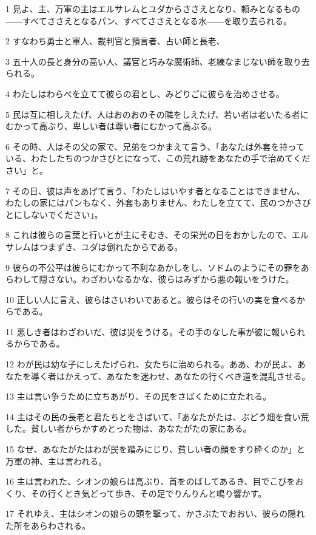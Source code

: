 \par 1 見よ、主、万軍の主はエルサレムとユダからささえとなり、頼みとなるもの――すべてささえとなるパン、すべてささえとなる水――を取り去られる。
\par 2 すなわち勇士と軍人、裁判官と預言者、占い師と長老、
\par 3 五十人の長と身分の高い人、議官と巧みな魔術師、老練なまじない師を取り去られる。
\par 4 わたしはわらべを立てて彼らの君とし、みどりごに彼らを治めさせる。
\par 5 民は互に相しえたげ、人はおのおのその隣をしえたげ、若い者は老いたる者にむかって高ぶり、卑しい者は尊い者にむかって高ぶる。
\par 6 その時、人はその父の家で、兄弟をつかまえて言う、「あなたは外套を持っている、わたしたちのつかさびとになって、この荒れ跡をあなたの手で治めてください」と。
\par 7 その日、彼は声をあげて言う、「わたしはいやす者となることはできません、わたしの家にはパンもなく、外套もありません、わたしを立てて、民のつかさびとにしないでください」。
\par 8 これは彼らの言葉と行いとが主にそむき、その栄光の目をおかしたので、エルサレムはつまずき、ユダは倒れたからである。
\par 9 彼らの不公平は彼らにむかって不利なあかしをし、ソドムのようにその罪をあらわして隠さない。わざわいなるかな、彼らはみずから悪の報いをうけた。
\par 10 正しい人に言え、彼らはさいわいであると。彼らはその行いの実を食べるからである。
\par 11 悪しき者はわざわいだ、彼は災をうける。その手のなした事が彼に報いられるからである。
\par 12 わが民は幼な子にしえたげられ、女たちに治められる。ああ、わが民よ、あなたを導く者はかえって、あなたを迷わせ、あなたの行くべき道を混乱させる。
\par 13 主は言い争うために立ちあがり、その民をさばくために立たれる。
\par 14 主はその民の長老と君たちとをさばいて、「あなたがたは、ぶどう畑を食い荒した。貧しい者からかすめとった物は、あなたがたの家にある。
\par 15 なぜ、あなたがたはわが民を踏みにじり、貧しい者の顔をすり砕くのか」と万軍の神、主は言われる。
\par 16 主は言われた、シオンの娘らは高ぶり、首をのばしてあるき、目でこびをおくり、その行くとき気どって歩き、その足でりんりんと鳴り響かす。
\par 17 それゆえ、主はシオンの娘らの頭を撃って、かさぶたでおおい、彼らの隠れた所をあらわされる。
